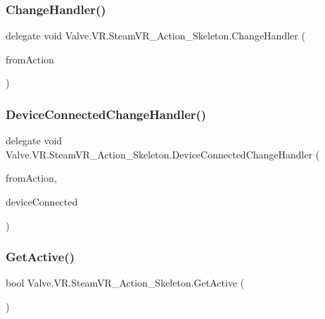 \subsubsection{\texorpdfstring{ChangeHandler()}{ChangeHandler()}}
{\footnotesize\ttfamily delegate void Valve.\+V\+R.\+Steam\+V\+R\+\_\+\+Action\+\_\+\+Skeleton.\+Change\+Handler (\begin{DoxyParamCaption}\item[{\mbox{\hyperlink{class_valve_1_1_v_r_1_1_steam_v_r___action___skeleton}{Steam\+V\+R\+\_\+\+Action\+\_\+\+Skeleton}}}]{from\+Action }\end{DoxyParamCaption})}

\mbox{\label{class_valve_1_1_v_r_1_1_steam_v_r___action___skeleton_a737d68e8f67790bf838b4f5bac3ffae1}} 
\subsubsection{\texorpdfstring{DeviceConnectedChangeHandler()}{DeviceConnectedChangeHandler()}}
{\footnotesize\ttfamily delegate void Valve.\+V\+R.\+Steam\+V\+R\+\_\+\+Action\+\_\+\+Skeleton.\+Device\+Connected\+Change\+Handler (\begin{DoxyParamCaption}\item[{\mbox{\hyperlink{class_valve_1_1_v_r_1_1_steam_v_r___action___skeleton}{Steam\+V\+R\+\_\+\+Action\+\_\+\+Skeleton}}}]{from\+Action,  }\item[{bool}]{device\+Connected }\end{DoxyParamCaption})}

\mbox{\label{class_valve_1_1_v_r_1_1_steam_v_r___action___skeleton_a8d5cfd8a2361cdc5b268eddbacd05230}} 
\subsubsection{\texorpdfstring{GetActive()}{GetActive()}}
{\footnotesize\ttfamily bool Valve.\+V\+R.\+Steam\+V\+R\+\_\+\+Action\+\_\+\+Skeleton.\+Get\+Active (\begin{DoxyParamCaption}{ }\end{DoxyParamCaption})}



